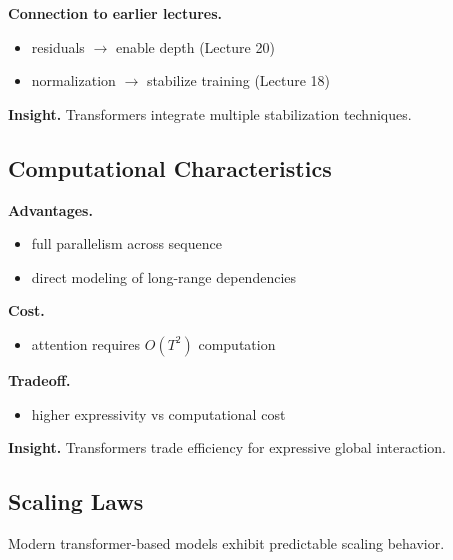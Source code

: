 \medskip

\noindent
\textbf{Connection to earlier lectures.}

\begin{itemize}
    \item residuals $\rightarrow$ enable depth (Lecture 20)
    \item normalization $\rightarrow$ stabilize training (Lecture 18)
\end{itemize}

\medskip

\noindent
\textbf{Insight.}  
Transformers integrate multiple stabilization techniques.

\subsection{Computational Characteristics}

\textbf{Advantages.}

\begin{itemize}
    \item full parallelism across sequence
    \item direct modeling of long-range dependencies
\end{itemize}

\medskip

\noindent
\textbf{Cost.}

\begin{itemize}
    \item attention requires $O(T^2)$ computation
\end{itemize}

\medskip

\noindent
\textbf{Tradeoff.}

\begin{itemize}
    \item higher expressivity vs computational cost
\end{itemize}

\medskip

\noindent
\textbf{Insight.}  
Transformers trade efficiency for expressive global interaction.

\subsection{Scaling Laws}

Modern transformer-based models exhibit predictable scaling behavior.

\medskip


